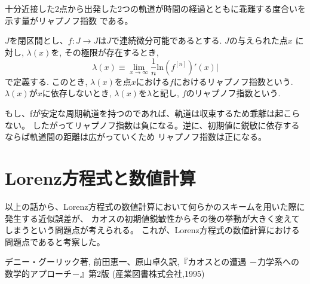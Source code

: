 \documentclass[12pt]{ltjsarticle}
\begin{document}
十分近接した2点から出発した2つの軌道が時間の経過とともに乖離する度合いを示す量がリャプノフ指数
である。\\
\begin{tcolorbox}
    $J$を閉区間とし、$f:J \rightarrow J$は$J$で連続微分可能であるとする. $J$の与えられた点$x$
    に対し, $\lambda(x)$を, その極限が存在するとき,
    \begin{equation*}
        \lambda(x) \equiv \lim_{x \to \infty} \frac{1}{n}\text{ln}\left(f^{[n]}\right)'(x)|
    \end{equation*}
    で定義する. このとき, $\lambda(x)$を点$x$における$f$におけるリャプノフ指数という.\\
    $\lambda(x)$が$x$に依存しないとき, $\lambda(x)$を$\lambda$と記し, $f$のリャプノフ指数という.\cite{chaos}
\end{tcolorbox}

もし、fが安定な周期軌道を持つのであれば、軌道は収束するため乖離は起こらない。
したがってリャプノフ指数は負になる。逆に、初期値に鋭敏に依存するならば軌道間の距離は広がっていくため
リャプノフ指数は正になる。

\section{Lorenz方程式と数値計算}
以上の話から、Lorenz方程式の数値計算において何らかのスキームを用いた際に発生する近似誤差が、
カオスの初期値鋭敏性からその後の挙動が大きく変えてしまうという問題点が考えられる。
これが、Lorenz方程式の数値計算における問題点であると考察した。

\begin{thebibliography}{1}
     デニー・グーリック著, 前田恵一、原山卓久訳,『カオスとの遭遇 －力学系への数学的アプローチ－』第2版 (産業図書株式会社,1995)
\end{thebibliography}
\end{document}
